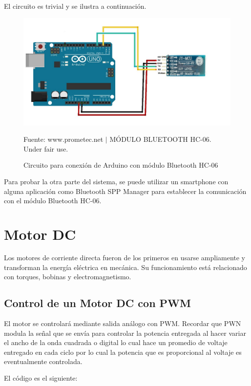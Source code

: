 \documentclass[conference]{IEEEtran}
\begin{document}
El circuito es trivial y se ilustra a continuación.

\begin{figure}[H]
\centering
\includegraphics[width=0.3\paperwidth]{images/bt-arduino-circuit.jpg}
\caption{Circuito para conexión de Arduino con módulo Bluetooth HC-06}
\footnotesize
Fuente: www.prometec.net $\mid$ MÓDULO BLUETOOTH HC-06. Under fair use. \cite{prometecnet-2019}
\end{figure}

Para probar la otra parte del sistema, se puede utilizar un smartphone con alguna aplicación como Bluetooth SPP Manager para establecer la comunicación con el módulo Bluetooth HC-06.

\section{Motor DC}

Los motores de corriente directa fueron de los primeros en usarse ampliamente y transforman la energía eléctrica en mecánica. Su funcionamiento está relacionado con torques, bobinas y electromagnetismo.

\subsection{Control de un Motor DC con PWM}

El motor se controlará mediante salida análogo con PWM. Recordar que PWN modula la señal que se envía para controlar la potencia entregada al hacer variar el ancho de la onda cuadrada o digital lo cual hace un promedio de voltaje entregado en cada ciclo por lo cual la potencia que es proporcional al voltaje es eventualmente controlada.

\bigbreak

El código es el siguiente:
\end{document}
